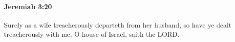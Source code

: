 
		\paragraph{Jeremiah 3:20} %
			\label{JEREMIAH-3-20}

			Surely as a wife treacherously departeth from her husband, so have ye dealt treacherously with me, O house of Israel, saith the LORD.


